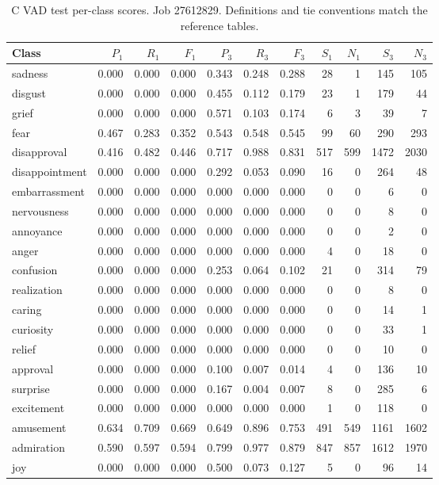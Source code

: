 \begin{table}[!htbp]
\centering
\scriptsize
\setlength{\tabcolsep}{5pt}
\begin{tabular}{lrrrrrrrrrr}
\toprule
Class & $P_1$ & $R_1$ & $F_1$ & $P_3$ & $R_3$ & $F_3$ & $S_1$ & $N_1$ & $S_3$ & $N_3$ \\
\midrule
sadness & 0.000 & 0.000 & 0.000 & 0.343 & 0.248 & 0.288 & 28 & 1 & 145 & 105 \\
disgust & 0.000 & 0.000 & 0.000 & 0.455 & 0.112 & 0.179 & 23 & 1 & 179 & 44 \\
grief & 0.000 & 0.000 & 0.000 & 0.571 & 0.103 & 0.174 & 6 & 3 & 39 & 7 \\
fear & 0.467 & 0.283 & 0.352 & 0.543 & 0.548 & 0.545 & 99 & 60 & 290 & 293 \\
disapproval & 0.416 & 0.482 & 0.446 & 0.717 & 0.988 & 0.831 & 517 & 599 & 1472 & 2030 \\
disappointment & 0.000 & 0.000 & 0.000 & 0.292 & 0.053 & 0.090 & 16 & 0 & 264 & 48 \\
embarrassment & 0.000 & 0.000 & 0.000 & 0.000 & 0.000 & 0.000 & 0 & 0 & 6 & 0 \\
nervousness & 0.000 & 0.000 & 0.000 & 0.000 & 0.000 & 0.000 & 0 & 0 & 8 & 0 \\
annoyance & 0.000 & 0.000 & 0.000 & 0.000 & 0.000 & 0.000 & 0 & 0 & 2 & 0 \\
anger & 0.000 & 0.000 & 0.000 & 0.000 & 0.000 & 0.000 & 4 & 0 & 18 & 0 \\
confusion & 0.000 & 0.000 & 0.000 & 0.253 & 0.064 & 0.102 & 21 & 0 & 314 & 79 \\
realization & 0.000 & 0.000 & 0.000 & 0.000 & 0.000 & 0.000 & 0 & 0 & 8 & 0 \\
caring & 0.000 & 0.000 & 0.000 & 0.000 & 0.000 & 0.000 & 0 & 0 & 14 & 1 \\
curiosity & 0.000 & 0.000 & 0.000 & 0.000 & 0.000 & 0.000 & 0 & 0 & 33 & 1 \\
relief & 0.000 & 0.000 & 0.000 & 0.000 & 0.000 & 0.000 & 0 & 0 & 10 & 0 \\
approval & 0.000 & 0.000 & 0.000 & 0.100 & 0.007 & 0.014 & 4 & 0 & 136 & 10 \\
surprise & 0.000 & 0.000 & 0.000 & 0.167 & 0.004 & 0.007 & 8 & 0 & 285 & 6 \\
excitement & 0.000 & 0.000 & 0.000 & 0.000 & 0.000 & 0.000 & 1 & 0 & 118 & 0 \\
amusement & 0.634 & 0.709 & 0.669 & 0.649 & 0.896 & 0.753 & 491 & 549 & 1161 & 1602 \\
admiration & 0.590 & 0.597 & 0.594 & 0.799 & 0.977 & 0.879 & 847 & 857 & 1612 & 1970 \\
joy & 0.000 & 0.000 & 0.000 & 0.500 & 0.073 & 0.127 & 5 & 0 & 96 & 14 \\
\bottomrule
\end{tabular}
\caption{C VAD test per-class scores. Job 27612829. Definitions and tie conventions match the reference tables.}
\label{tab:classes-c_emotion_vad}
\end{table}
